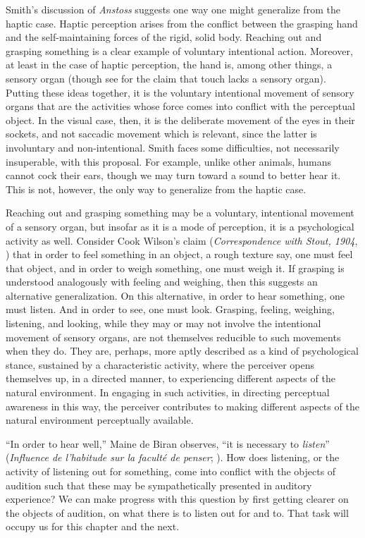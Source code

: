 Smith's \citeyearpar{Smith:2002sa} discussion of \emph{Anstoss} suggests one way one might generalize from the haptic case. Haptic perception arises from the conflict between the grasping hand and the self-maintaining forces of the rigid, solid body. Reaching out and grasping something is a clear example of voluntary intentional action. Moreover, at least in the case of haptic perception, the hand is, among other things, a sensory organ (though see \citealt{Paterson:2007aa} for the claim that touch lacks a sensory organ). Putting these ideas together, it is the voluntary intentional movement of sensory organs that are the activities whose force comes into conflict with the perceptual object. In the visual case, then, it is the deliberate movement of the eyes in their sockets, and not saccadic movement which is relevant, since the latter is involuntary and non-intentional. Smith faces some difficulties, not necessarily insuperable, with this proposal. For example, unlike other animals, humans cannot cock their ears, though we may turn toward a sound to better hear it. This is not, however, the only way to generalize from the haptic case. 

Reaching out and grasping something may be a voluntary, intentional movement of a sensory organ, but insofar as it is a mode of perception, it is a psychological activity as well. Consider Cook Wilson's claim (\emph{Correspondence with Stout, 1904}, \citeyear{Cook-Wilson:1926sf}) that in order to feel something in an object, a rough texture say, one must feel that object, and in order to weigh something, one must weigh it. If grasping is understood analogously with feeling and weighing, then this suggests an alternative generalization. On this alternative, in order to hear something, one must listen. And in order to see, one must look. Grasping, feeling, weighing, listening, and looking, while they may or may not involve the intentional movement of sensory organs, are not themselves reducible to such movements when they do. They are, perhaps, more aptly described as a kind of psychological stance, sustained by a characteristic activity, where the perceiver opens themselves up, in a directed manner, to experiencing different aspects of the natural environment. In engaging in such activities, in directing perceptual awareness in this way, the perceiver contributes to making different aspects of the natural environment perceptually available.

``In order to hear well,'' Maine de Biran observes, ``it is necessary to \emph{listen}'' (\emph{Influence de l'habitude sur la faculté de penser}; \citealt[63--4]{Boehm:1929aa}). How does listening, or the activity of listening out for something, come into conflict with the objects of audition such that these may be sympathetically presented in auditory experience? We can make progress with this question by first getting clearer on the objects of audition, on what there is to listen out for and to. That task will occupy us for this chapter and the next.

